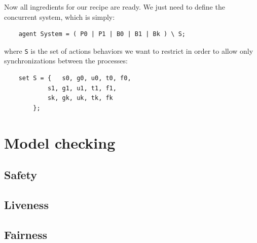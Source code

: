\documentclass[10pt,a4paper]{article}
\newcommand{\CCSCode}[1]{{\tt #1}}
\begin{document}
    Now all ingredients for our recipe are ready. We just need to define
    the concurrent system, which is simply:
    \begin{verbatim}
    agent System = ( P0 | P1 | B0 | B1 | Bk ) \ S;
    \end{verbatim}
    where \CCSCode{S} is the set of actions behaviors we want to restrict
    in order to allow only synchronizations between the processes:
    \begin{verbatim}
    set S = {   s0, g0, u0, t0, f0,
            s1, g1, u1, t1, f1,
            sk, gk, uk, tk, fk
        };
    \end{verbatim}

\section{Model checking}

    \subsection{Safety}

    \subsection{Liveness}

    \subsection{Fairness}
\end{document}
